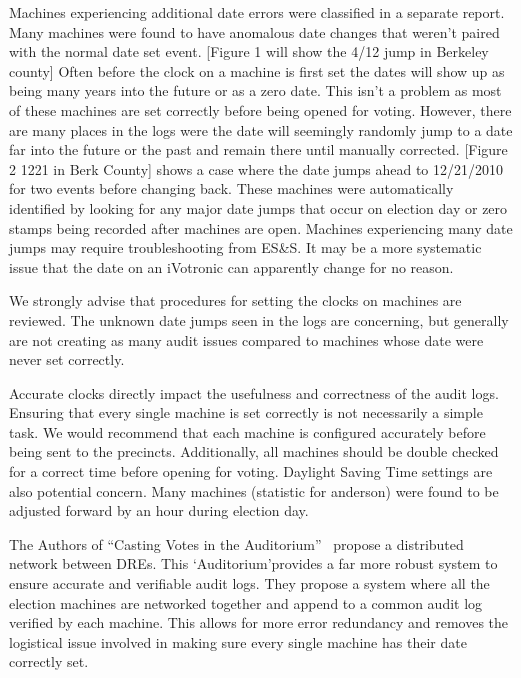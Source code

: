 Machines experiencing additional date errors were classified in a separate report.  Many machines were found to have anomalous date changes that weren't paired with the normal date set event. [Figure 1 will show the 4/12 jump in Berkeley county] Often before the clock on a machine is first set the dates will show up as being many years into the future or as a zero date.  This isn't a problem as most  of these machines are set correctly before being opened for voting.  However, there are many places in the logs were the date will seemingly randomly jump to a date far into the future or the past and remain there until manually corrected.  [Figure 2 12\/21 in Berk County] shows a case where the date jumps ahead to 12/21/2010 for two events before changing back.  These machines were automatically identified by looking for any major date jumps that occur on election day or zero stamps being recorded after machines are open. Machines experiencing many date jumps may require troubleshooting from ES\&S.  It may be a more systematic issue that the date on an iVotronic can apparently change for no reason.

We strongly advise that procedures for setting the clocks on machines are reviewed.  The unknown date jumps seen in the logs are concerning, but generally are not creating as many audit issues compared to machines whose date were never set correctly.

Accurate clocks directly impact the usefulness and correctness of the audit logs. Ensuring that every single machine is set correctly is not necessarily a simple task.  We would recommend that each machine is configured accurately before being sent to the precincts.  Additionally, all machines should be double checked for a correct time before opening for voting.  Daylight Saving Time settings are also potential concern.  Many machines (statistic for anderson) were found to be adjusted forward by an hour during election day.  

The Authors of \textquotedblleft Casting Votes in the Auditorium\textquotedblright~\cite{Sandler2007} propose a distributed network between DREs.  This \textquoteleft Auditorium\textquoteright provides a far more robust system to ensure accurate and verifiable audit logs.  They propose a system where all the election machines are networked together and append to a common audit log verified by each machine.  This allows for more error redundancy and removes the logistical issue involved in making sure every single machine has their date correctly set.
